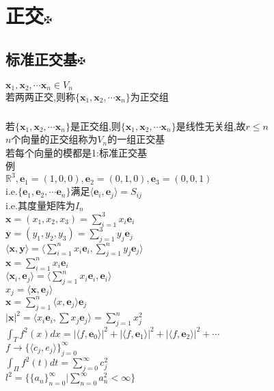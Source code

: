 \documentclass[11pt, a4paper, UTF8]{ctexart}
\begin{document}
\section{正交\protect\hyperlink{catalog}{$\fuck$}}
\subsection{标准正交基\protect\hyperlink{catalog}{$\fuck$}}
$\bm x_1,\bm x_2,\cdots\bm x_n\in V_n$\\
若两两正交,则称$\{\bm x_1,\bm x_2,\cdots\bm x_n\}$为正交组\\
\subsubsection{}
若$\{\bm x_1,\bm x_2,\cdots\bm x_n\}$是正交组,则$\{\bm x_1,\bm x_2,\cdots\bm x_n\}$是线性无关组,故$r\le n$\\
$n$个向量的正交组称为$V_n$的一组正交基\\
若每个向量的模都是1:标准正交基\\
例\\
$\mathbb{R}^3,\bm e_1=(1,0,0),\bm e_2=(0,1,0),\bm e_3=(0,0,1)$\\
i.e.$\{\bm e_1,\bm e_2,\cdots\bm e_n\}$满足$\langle\bm e_i,\bm e_j\rangle=S_{ij}$\\
i.e.其度量矩阵为$I_n$\\
$\bm x=(x_1,x_2,x_3)=\sum_{i=1}^3x_i\bm e_i$\\
$\bm y=(y_1,y_2,y_3)=\sum_{j=1}^3y_j\bm e_j$\\
$\langle\bm x,\bm y\rangle=\langle\sum_{i=1}^nx_i\bm e_i,\sum_{j=1}^ny_j\bm e_j\rangle$\\
$\bm x=\sum_{i=1}^nx_i\bm e_i$\\
$\langle\bm x_i,\bm e_j\rangle=\langle\sum_{j=1}^nx_i\bm e_i,\bm e_i\rangle$\\
$x_j=\langle\bm x,\bm e_j\rangle$\\
$\bm x=\sum_{j=1}^n\langle x,\bm e_j\rangle\bm e_j$\\
$|\bm x|^2=\langle x_i\bm e_i,\sum x_j\bm e_j\rangle=\sum_{j=1}^nx_j^2$\\
$\int_Tf^2(x)dx=|\langle f,\bm e_0\rangle|^2+|\langle f,\bm e_1\rangle|^2+|\langle f,\bm e_2\rangle|^2+\cdots$\\
$f\to\{\langle c_j,e_j\rangle\}_{j=0}^\infty$\\
$\int_\Pi f^2(t)dt=\sum_{j=0}^\infty c^2_j$\\
$l^2=\{\{a_n\}_{n=0}^\infty|\sum_{n=0}^\infty a_n^2<\infty\}$\\
\end{document}
